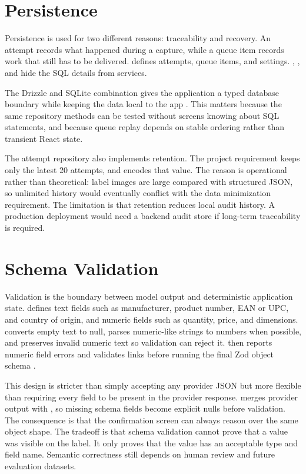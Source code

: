 \section{Persistence}

Persistence is used for two different reasons: traceability and recovery. An attempt records what happened during a capture, while a queue item records work that still has to be delivered.  defines attempts, queue items, and settings. , , and  hide the SQL details from services.

The Drizzle and SQLite combination gives the application a typed database boundary while keeping the data local to the app \cite{drizzle,expo-sqlite}. This matters because the same repository methods can be tested without screens knowing about SQL statements, and because queue replay depends on stable ordering rather than transient React state.

The attempt repository also implements retention. The project requirement keeps only the latest 20 attempts, and  encodes that value. The reason is operational rather than theoretical: label images are large compared with structured JSON, so unlimited history would eventually conflict with the data minimization requirement. The limitation is that retention reduces local audit history. A production deployment would need a backend audit store if long-term traceability is required.

\section{Schema Validation}

Validation is the boundary between model output and deterministic application state.  defines text fields such as manufacturer, product number, EAN or UPC, and country of origin, and numeric fields such as quantity, price, and dimensions.  converts empty text to null, parses numeric-like strings to numbers when possible, and preserves invalid numeric text so validation can reject it.  then reports numeric field errors and validates links before running the final Zod object schema \cite{zod}.

This design is stricter than simply accepting any provider JSON but more flexible than requiring every field to be present in the provider response.  merges provider output with , so missing schema fields become explicit nulls before validation. The consequence is that the confirmation screen can always reason over the same object shape. The tradeoff is that schema validation cannot prove that a value was visible on the label. It only proves that the value has an acceptable type and field name. Semantic correctness still depends on human review and future evaluation datasets.

